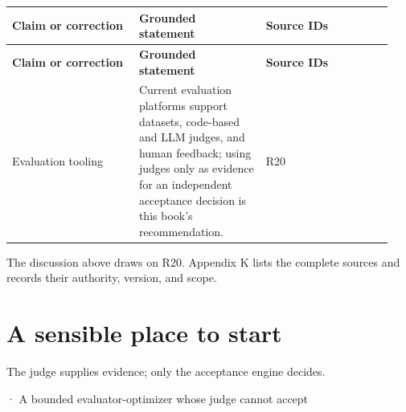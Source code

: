 \BookTableStart
\small
\begin{longtable}{@{}Y{0.3133\linewidth}Y{0.3133\linewidth}Y{0.3133\linewidth}@{}}
\color{white}\bfseries \textbf{Claim or correction} & \color{white}\bfseries \textbf{Grounded statement} & \color{white}\bfseries \textbf{Source IDs} \\
\endfirsthead
{}
\color{white}\bfseries \textbf{Claim or correction} & \color{white}\bfseries \textbf{Grounded statement} & \color{white}\bfseries \textbf{Source IDs} \\
\endhead
Evaluation tooling & Current evaluation platforms support datasets, code-based and LLM judges, and human feedback; using judges only as evidence for an independent acceptance decision is this book's recommendation. & R20 \\
\end{longtable}
\BookTableEnd

The discussion above draws on R20. Appendix K lists the complete sources and records their authority, version, and scope.\par

\section{A sensible place to start}

The judge supplies evidence; only the acceptance engine decides.\par

\BookSnake · A bounded evaluator-optimizer whose judge cannot accept\par


